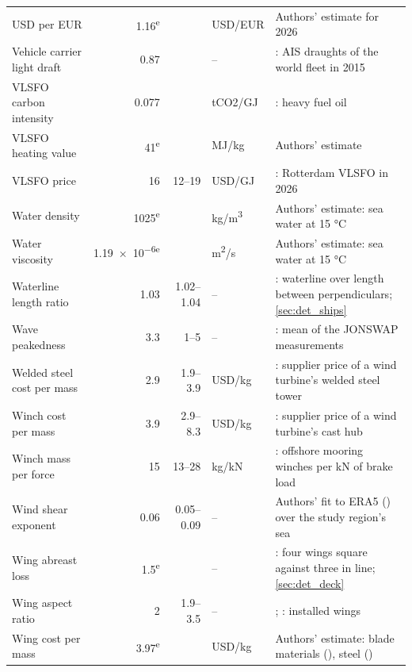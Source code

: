 \begin{longtable}{@{}>{\raggedright\arraybackslash}p{3.4cm}rr>{\raggedright\arraybackslash}p{1.4cm}>{\raggedright\arraybackslash}p{5.8cm}@{}}
USD per EUR & \num{1.16}\textsuperscript{e} &  & USD/EUR & Authors' estimate for 2026 \\
Vehicle carrier light draft & \num{0.87} &  & -- & \citet[Appendix J]{olmer2017}: AIS draughts of the world fleet in 2015 \\
VLSFO carbon intensity & \num{0.077} &  & tCO2/GJ & \citet[Annex II]{eu2023fueleu}: heavy fuel oil \\
VLSFO heating value & \num{41}\textsuperscript{e} &  & MJ/kg & Authors' estimate \\
VLSFO price & \num{16} & \num{12}--\num{19} & USD/GJ & \citet{shipandbunker2026rotterdam}: Rotterdam VLSFO in 2026 \\
Water density & \num{1025}\textsuperscript{e} &  & kg/m\textsuperscript{3} & Authors' estimate: sea water at 15 °C \\
Water viscosity & \num{1.19e-6}\textsuperscript{e} &  & m\textsuperscript{2}/s & Authors' estimate: sea water at 15 °C \\
Waterline length ratio & \num{1.03} & \num{1.02}--\num{1.04} & -- & \citet[p. 7]{man2011}: waterline over length between perpendiculars; \cref{sec:det_ships} \\
Wave peakedness & \num{3.3} & \num{1}--\num{5} & -- & \citet{hasselmann1973}: mean of the JONSWAP measurements \\
Welded steel cost per mass & \num{2.9} & \num{1.9}--\num{3.9} & USD/kg & \citet{wisdem_csm}: supplier price of a wind turbine's welded steel tower \\
Winch cost per mass & \num{3.9} & \num{2.9}--\num{8.3} & USD/kg & \citet{wisdem_csm}: supplier price of a wind turbine's cast hub \\
Winch mass per force & \num{15} & \num{13}--\num{28} & kg/kN & \citet{broehl2018offshore}: offshore mooring winches per kN of brake load \\
Wind shear exponent & \num{0.06} & \num{0.05}--\num{0.09} & -- & Authors' fit to ERA5 (\citealp{hersbach2020}) over the study region's sea \\
Wing abreast loss & \num{1.5}\textsuperscript{e} &  & -- & \citet[Tables 3.2-3.3]{vanreen2026}: four wings square against three in line; \cref{sec:det_deck} \\
Wing aspect ratio & \num{2} & \num{1.9}--\num{3.5} & -- & \citet{bar2026windwings}; \citet{oceanbird2026wing560}: installed wings \\
Wing cost per mass & \num{3.97}\textsuperscript{e} &  & USD/kg & Authors' estimate: blade materials (\citealp{bortolotti2019blade}), steel (\citealp{wisdem_csm}) \\

\end{longtable}
